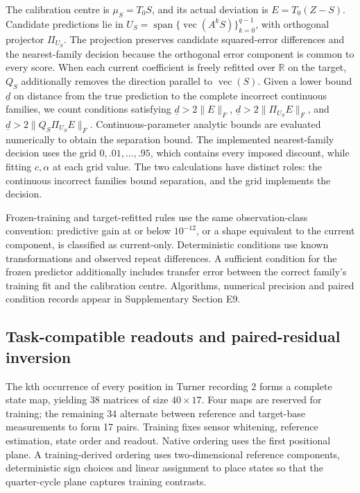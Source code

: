 \documentclass[11pt,a4paper]{article}
\begin{document}
The calibration centre is \(\mu_S=T_0S\), and its actual deviation is
\(E=T_0(Z-S)\). Candidate predictions lie in
\(U_S=\operatorname{span}\{\operatorname{vec}(A^kS)\}_{k=0}^{q-1}\),
with orthogonal projector \(\Pi_{U_S}\). The projection preserves
candidate squared-error differences and the nearest-family decision
because the orthogonal error component is common to every score. When
each current coefficient is freely refitted over \(\mathbb R\) on the
target, \(Q_S\) additionally removes the direction parallel to
\(\operatorname{vec}(S)\). Given a lower bound \(\underline d\) on
distance from the true prediction to the complete incorrect continuous
families, we count conditions satisfying \(\underline d>2\|E\|_F\),
\(\underline d>2\|\Pi_{U_S}E\|_F\), and
\(\underline d>2\|Q_S\Pi_{U_S}E\|_F\). Continuous-parameter analytic
bounds are evaluated numerically to obtain the separation bound. The
implemented nearest-family decision uses the grid \(0,.01,\ldots,.95\),
which contains every imposed discount, while fitting \(c,\alpha\) at
each grid value. The two calculations have distinct roles: the
continuous incorrect families bound separation, and the grid implements
the decision.

Frozen-training and target-refitted rules use the same observation-class
convention: predictive gain at or below \(10^{-12}\), or a shape
equivalent to the current component, is classified as current-only.
Deterministic conditions use known transformations and observed repeat
differences. A sufficient condition for the frozen predictor
additionally includes transfer error between the correct family's
training fit and the calibration centre. Algorithms, numerical precision
and paired condition records appear in Supplementary Section E9.

\subsection{Task-compatible readouts and paired-residual
inversion}\label{task-compatible-readouts-and-paired-residual-inversion}

The kth occurrence of every position in Turner recording 2 forms a
complete state map, yielding 38 matrices of size \(40\times17\). Four
maps are reserved for training; the remaining 34 alternate between
reference and target-base measurements to form 17 pairs. Training fixes
sensor whitening, reference estimation, state order and readout. Native
ordering uses the first positional plane. A training-derived ordering
uses two-dimensional reference components, deterministic sign choices
and linear assignment to place states so that the quarter-cycle plane
captures training contrasts.
\end{document}
